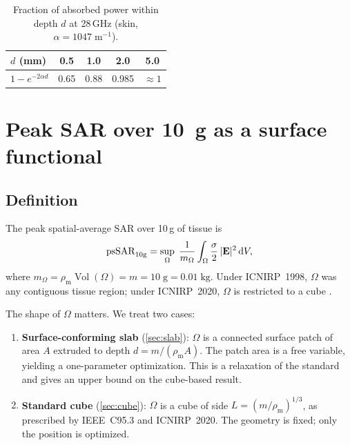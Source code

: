 \documentclass[11pt,a4paper]{article}
\theoremstyle{definition}
\theoremstyle{remark}
\newcommand{\psSAR}{\ensuremath{\mathrm{psSAR}_{10\mathrm{g}}}}
\newcommand{\rhom}{\rho_{\mathrm{m}}}
\begin{document}
\begin{table}[ht]
\centering
\caption{Fraction of absorbed power within depth $d$ at 28\,GHz (skin,
$\alpha = 1047\;\mathrm{m^{-1}}$).}
\label{tab:depth-fraction}
\begin{tabular}{@{}lcccc@{}}
\toprule
$d$ (mm) & 0.5 & 1.0 & 2.0 & 5.0 \\
\midrule
$1 - e^{-2\alpha d}$ & 0.65 & 0.88 & 0.985 & $\approx 1$ \\
\bottomrule
\end{tabular}
\end{table}


\section{Peak SAR over 10~g as a surface functional}
\label{sec:psSAR}

\subsection{Definition}

The peak spatial-average SAR over 10\,g of tissue is
\begin{equation}\label{eq:psSAR-def}
  \psSAR
  = \sup_\Omega\;\frac{1}{m_\Omega}
    \int_\Omega \frac{\sigma}{2}\,|\vb{E}|^2\,\mathrm{d}V,
\end{equation}
where $m_\Omega = \rhom\operatorname{Vol}(\Omega) = m = 10\;\mathrm{g} = 0.01\;\mathrm{kg}$.
Under ICNIRP~1998, $\Omega$ was any contiguous tissue region; under
ICNIRP~2020, $\Omega$ is restricted to a cube \cite{ICNIRP2020}.

The shape of $\Omega$ matters.  We treat two cases:
\begin{enumerate}[nosep]
\item \textbf{Surface-conforming slab} (\cref{sec:slab}): $\Omega$ is a
  connected surface patch of area $A$ extruded to depth $d = m/(\rhom A)$.
  The patch area is a free variable, yielding a one-parameter optimization.
  This is a relaxation of the standard and gives an upper bound on the
  cube-based result.
\item \textbf{Standard cube} (\cref{sec:cube}): $\Omega$ is a cube of
  side $L = (m/\rhom)^{1/3}$, as prescribed by IEEE~C95.3 and
  ICNIRP~2020.  The geometry is fixed; only the position is optimized.
\end{enumerate}
\end{document}
